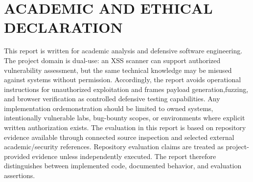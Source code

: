 \chapter*{\MakeUppercase{ACADEMIC AND ETHICAL DECLARATION}} 
This report is written for academic analysis and defensive software engineering. The project domain is dual-use: an XSS scanner can support authorized vulnerability assessment, but the same technical knowledge may be misused against systems without permission. Accordingly, the report avoids operational instructions for unauthorized exploitation and frames payload generation,fuzzing, and browser verification as controlled defensive testing capabilities. Any implementation ordemonstration should be limited to owned systems, intentionally vulnerable labs, bug-bounty scopes, or environments where explicit written authorization exists. The evaluation in this report is based on repository evidence available through connected source inspection and selected external academic/security references. Repository evaluation claims are treated as project-provided evidence unless independently executed. The report therefore distinguishes between implemented code, documented behavior, and evaluation assertions.